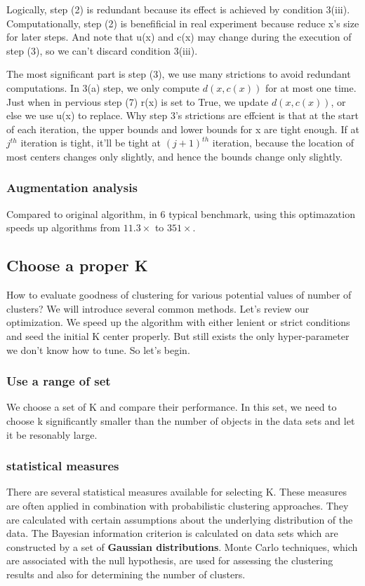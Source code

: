 \documentclass[11pt]{article}
\begin{document}
Logically, step (2) is redundant because its effect is achieved by condition 3(iii). Computationally, step (2) is benefificial in real experiment because reduce x's size for later steps. And note that u(x) and c(x) may change during the execution of step (3), so we can't discard condition 3(iii).\par
The most significant part is step (3), we use many strictions to avoid redundant computations. In 3(a) step, we only compute $d(x,c(x))$ for at most one time. Just when in pervious step (7) r(x) is set to True, we update  $d(x,c(x))$, or else we use u(x) to replace. Why step 3's strictions are effcient is that at the start of each iteration, the upper bounds and lower bounds for x are tight enough. If at $j^{th}$ iteration is tight, it'll be tight at $(j+1)^{th}$ iteration, because the location of most centers changes only slightly, and hence the bounds change only slightly. \par

\subsubsection{Augmentation analysis}
Compared to original algorithm, in 6 typical benchmark, using this optimazation speeds up algorithms from $ 11.3 \times$ to $  351 \times$.

\subsection{Choose a proper K}
How to evaluate goodness of clustering for various potential values of number of clusters? We will introduce several common methods.\cite{datamining,inproceedings,articleToBound,doi:10.1243/095440605X8298} Let's review our optimization. We speed up the algorithm with either lenient or strict conditions and seed the initial K center properly. But still exists the only hyper-parameter we don't know how to tune. So let's begin. \par


\subsubsection{Use a range of set}
We choose a set of K and compare their performance. In this set, we need to choose k significantly smaller than the number of objects in the data sets and let it be resonably large.

\subsubsection{statistical measures}
There are several statistical measures available for selecting K. These measures are often applied in combination with probabilistic clustering approaches.
They are calculated with certain assumptions about the underlying distribution of the data. The Bayesian information criterion is calculated on data sets which are constructed by a set of \textbf{Gaussian distributions}. Monte Carlo techniques, which are associated with the null hypothesis, are used for assessing the clustering results and also for determining the number of clusters.
\end{document}
